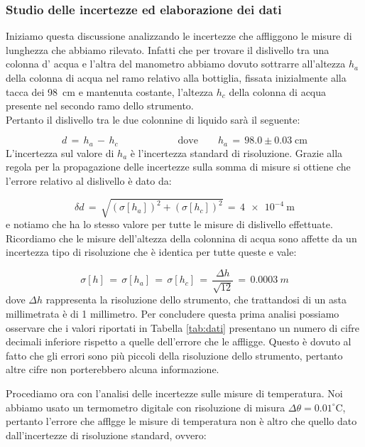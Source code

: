 \subsubsection{Studio delle incertezze ed elaborazione dei dati}
\label{dati_incertezze}

Iniziamo questa discussione analizzando le incertezze che affliggono le misure di lunghezza che abbiamo rilevato. Infatti che per trovare il dislivello tra una colonna d' acqua e l'altra del manometro abbiamo dovuto sottrarre all'altezza $h_a$ della colonna di acqua nel ramo relativo alla bottiglia, fissata inizialmente alla tacca dei \SI{98}{\centi\metre} e mantenuta costante, l'altezza $h_c$ della colonna di acqua presente nel secondo ramo dello strumento.\\
Pertanto il dislivello tra le due colonnine di liquido sarà il seguente:

\begin{equation*}
    d \,=\, h_a \,-\, h_c \qquad \qquad \qquad \text{dove} \qquad h_a \,=\, 98.0 \pm 0.03 \; \si{\centi\metre} 
\end{equation*}
%
L'incertezza sul valore di $h_a$ è l'incertezza standard di risoluzione.
Grazie alla regola per la propagazione delle incertezze sulla somma di misure si ottiene che l'errore relativo al dislivello è dato da:

\begin{equation*}
    \delta d \,=\, \sqrt{(\sigma [h_a])^2+(\sigma [h_c])^2} \,=\, \SI{4e-4}{\metre}
\end{equation*}
%
e notiamo che ha lo stesso valore per tutte le misure di dislivello effettuate. Ricordiamo che le misure dell'altezza della colonnina di acqua sono affette da un incertezza tipo di risoluzione che è identica per tutte queste e vale:

\begin{equation*}
	\sigma [h] \,=\, \sigma [h_a] \,=\, \sigma [h_c] \,=\, \frac{\Delta h}{\sqrt{12}} \,=\, \SI{0.0003}{m} 
\end{equation*}
%
dove $\Delta h$ rappresenta la risoluzione dello strumento, che trattandosi di un asta millimetrata è di 1 millimetro. Per concludere questa prima analisi possiamo osservare che i valori riportati in Tabella \ref{tab:dati} presentano un numero di cifre decimali inferiore rispetto a quelle dell'errore che le affligge. Questo è dovuto al fatto che gli errori sono più piccoli della risoluzione dello strumento, pertanto altre cifre non porterebbero alcuna informazione.

Procediamo ora con l'analisi delle incertezze sulle misure di temperatura. Noi abbiamo usato un termometro digitale con risoluzione di misura $\Delta \theta = 0.01 ^\circ$C, pertanto l'errore che afflgge le misure di temperatura non è altro che quello dato dall'incertezze di risoluzione standard, ovvero:

